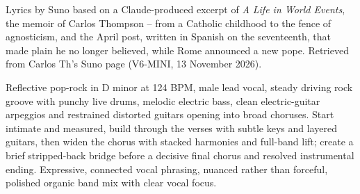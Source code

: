
\label{sec:the-bridge-before-i-named-it}
\begin{notes}
Lyrics by Suno based on a Claude-produced excerpt of \emph{A Life in World Events}, the memoir of Carlos Thompson -- from a Catholic childhood to the fence of agnosticism, and the April post, written in Spanish on the seventeenth, that made plain he no longer believed, while Rome announced a new pope. Retrieved from Carlos Th's Suno page (V6-MINI, 13 November 2026).
\end{notes}
\begin{style}
Reflective pop-rock in D minor at 124 BPM, male lead vocal, steady driving rock groove with punchy live drums, melodic electric bass, clean electric-guitar arpeggios and restrained distorted guitars opening into broad choruses. Start intimate and measured, build through the verses with subtle keys and layered guitars, then widen the chorus with stacked harmonies and full-band lift; create a brief stripped-back bridge before a decisive final chorus and resolved instrumental ending. Expressive, connected vocal phrasing, nuanced rather than forceful, polished organic band mix with clear vocal focus.
\end{style}
